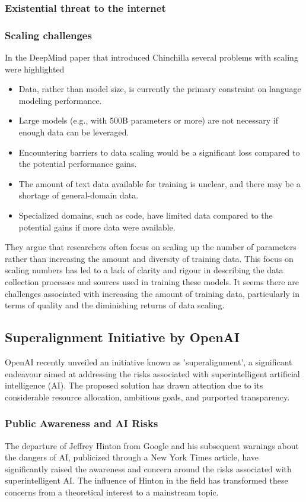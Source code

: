 \subsubsection{Existential threat to the internet}
\subsubsection{Scaling challenges}
In the DeepMind paper that introduced Chinchilla \cite{hoffmann2022empirical} several problems with scaling were highlighted
\begin{itemize}
\item Data, rather than model size, is currently the primary constraint on language modeling performance.
\item Large models (e.g., with 500B parameters or more) are not necessary if enough data can be leveraged.
\item Encountering barriers to data scaling would be a significant loss compared to the potential performance gains.
\item The amount of text data available for training is unclear, and there may be a shortage of general-domain data.
\item Specialized domains, such as code, have limited data compared to the potential gains if more data were available.
\end{itemize}
They argue that researchers often focus on scaling up the number of parameters rather than increasing the amount and diversity of training data. This focus on scaling numbers has led to a lack of clarity and rigour in describing the data collection processes and sources used in training these models. It seems  there are challenges associated with increasing the amount of training data, particularly in terms of quality and the diminishing returns of data scaling. 

\subsection{Superalignment Initiative by OpenAI}
OpenAI recently unveiled an initiative known as 'superalignment', a significant endeavour aimed at addressing the risks associated with superintelligent artificial intelligence (AI). The proposed solution has drawn attention due to its considerable resource allocation, ambitious goals, and purported transparency.

\subsubsection{Public Awareness and AI Risks}
The departure of Jeffrey Hinton from Google and his subsequent warnings about the dangers of AI, publicized through a New York Times article, have significantly raised the awareness and concern around the risks associated with superintelligent AI. The influence of Hinton in the field has transformed these concerns from a theoretical interest to a mainstream topic.

